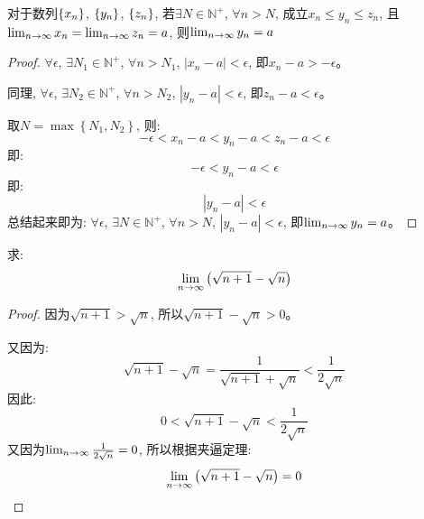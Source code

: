 \begin{theorem}[数列极限的夹逼性定理]
    对于数列$\left\{ x_n\right\}$, $\left\{ y_n\right\}$, $\left\{ z_n\right\}$, 若$\exists N \in \mathbb{N}^+$, $\forall n > N$, 成立$x_n \le y_n \le z_n$, 且$\lim_{n \to \infty } x_n = \lim_{n \to \infty } z_n = a$, 则$\lim_{n \to \infty } y_n = a$
\end{theorem}
\begin{proof}
    $\forall \epsilon$, $\exists N_1 \in \mathbb{N}^+$, $\forall n > N_1$, $\left| x_n - a\right| < \epsilon$, 即$x_n -a > -\epsilon$。

    同理, $\forall \epsilon$, $\exists N_2 \in \mathbb{N}^+$, $\forall n > N_2$, $\left| y_n - a\right| < \epsilon$, 即$z_n -a < \epsilon$。

    取$N = \max\left\{ N_1, N_2 \right\}$, 则:
    \begin{equation*}
        -\epsilon < x_n - a < y_n - a < z_n - a < \epsilon
    \end{equation*}
    即: 
    \begin{equation*}
        -\epsilon < y_n - a <\epsilon
    \end{equation*}
    即:
    \begin{equation*}
        \left| y_n - a \right| < \epsilon
    \end{equation*}
    总结起来即为:
    $\forall \epsilon$, $\exists N \in \mathbb{N}^+$, $\forall n > N$, $\left| y_n - a\right| < \epsilon$, 即$\lim_{n \to \infty } y_n = a$。

\end{proof}
\begin{example}
    求: 
    \begin{equation*}
        \lim_{n \to \infty } \left(\sqrt{n+1} - \sqrt{n}\right)
    \end{equation*}
\end{example}
\begin{proof}
    因为$\sqrt{n+1} > \sqrt{n}$, 所以$\sqrt{n+1} - \sqrt{n} > 0$。

    又因为:
    \begin{equation*}
        \sqrt{n+1}-\sqrt{n} = \frac{1}{\sqrt{n+1}+\sqrt{n}} < \frac{1}{2\sqrt{n}}
    \end{equation*}
    因此:
    \begin{equation*}
        0 < \sqrt{n+1} - \sqrt{n} < \frac{1}{2\sqrt{n}}
    \end{equation*}
    又因为$\lim_{n \to \infty } \frac{1}{2\sqrt{n}} = 0$, 所以根据夹逼定理:
    \begin{equation*}
        \lim_{n \to \infty } \left(\sqrt{n+1}-\sqrt{n}\right) = 0
    \end{equation*}
\end{proof}
